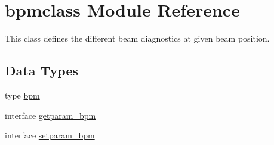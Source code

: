 \hypertarget{namespacebpmclass}{}\section{bpmclass Module Reference}
\label{namespacebpmclass}


This class defines the different beam diagnostics at given beam position.  


\subsection*{Data Types}
\begin{DoxyCompactItemize}
\item 
type \mbox{\hyperlink{namespacebpmclass_structbpmclass_1_1bpm}{bpm}}
\item 
interface \mbox{\hyperlink{interfacebpmclass_1_1getparam__bpm}{getparam\+\_\+bpm}}
\item 
interface \mbox{\hyperlink{interfacebpmclass_1_1setparam__bpm}{setparam\+\_\+bpm}}
\end{DoxyCompactItemize}
